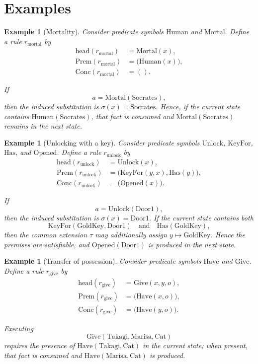 \documentclass[11pt]{article}
\newtheorem{example}[definition]{Example}
\newcommand{\headsym}{\mathrm{head}}
\newcommand{\Prem}{\mathrm{Prem}}
\newcommand{\Conc}{\mathrm{Conc}}
\begin{document}
\section{Examples}

\begin{example}[Mortality]
Consider predicate symbols $\mathrm{Human}$ and $\mathrm{Mortal}$.
Define a rule $r_{\mathrm{mortal}}$ by
\begin{align*}
\headsym(r_{\mathrm{mortal}}) &= \mathrm{Mortal}(x), \\
\Prem(r_{\mathrm{mortal}}) &= \bigl(\mathrm{Human}(x)\bigr), \\
\Conc(r_{\mathrm{mortal}}) &= ().
\end{align*}

If
\[
a=\mathrm{Mortal}(\mathrm{Socrates}),
\]
then the induced substitution is $\sigma(x)=\mathrm{Socrates}$.
Hence, if the current state contains $\mathrm{Human}(\mathrm{Socrates})$, that fact is consumed and $\mathrm{Mortal}(\mathrm{Socrates})$ remains in the next state.
\end{example}

\begin{example}[Unlocking with a key]
Consider predicate symbols $\mathrm{Unlock}$, $\mathrm{KeyFor}$, $\mathrm{Has}$, and $\mathrm{Opened}$.
Define a rule $r_{\mathrm{unlock}}$ by
\begin{align*}
\headsym(r_{\mathrm{unlock}}) &= \mathrm{Unlock}(x), \\
\Prem(r_{\mathrm{unlock}}) &= \bigl(\mathrm{KeyFor}(y,x),\mathrm{Has}(y)\bigr), \\
\Conc(r_{\mathrm{unlock}}) &= \bigl(\mathrm{Opened}(x)\bigr).
\end{align*}

If
\[
a=\mathrm{Unlock}(\mathrm{Door1}),
\]
then the induced substitution is $\sigma(x)=\mathrm{Door1}$.
If the current state contains both
\[
\mathrm{KeyFor}(\mathrm{GoldKey},\mathrm{Door1})
\quad\text{and}\quad
\mathrm{Has}(\mathrm{GoldKey}),
\]
then the common extension $\tau$ may additionally assign
$y \mapsto \mathrm{GoldKey}$.
Hence the premises are satisfiable, and $\mathrm{Opened}(\mathrm{Door1})$ is produced in the next state.
\end{example}

\begin{example}[Transfer of possession]
Consider predicate symbols $\mathrm{Have}$ and $\mathrm{Give}$.
Define a rule $r_{\mathrm{give}}$ by
\begin{align*}
\headsym(r_{\mathrm{give}}) &= \mathrm{Give}(x,y,o), \\
\Prem(r_{\mathrm{give}}) &= \bigl(\mathrm{Have}(x,o)\bigr), \\
\Conc(r_{\mathrm{give}}) &= \bigl(\mathrm{Have}(y,o)\bigr).
\end{align*}

Executing
\[
\mathrm{Give}(\mathrm{Takagi},\mathrm{Marisa},\mathrm{Cat})
\]
requires the presence of $\mathrm{Have}(\mathrm{Takagi},\mathrm{Cat})$ in the current state; when present, that fact is consumed and $\mathrm{Have}(\mathrm{Marisa},\mathrm{Cat})$ is produced.
\end{example}
\end{document}
